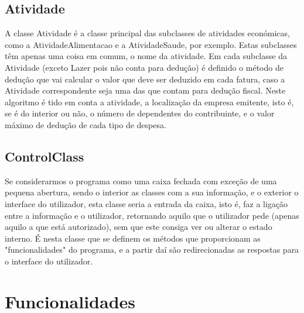 
\subsection{Atividade}
A classe Atividade é a classe principal das subclasses de atividades económicas, como a AtividadeAlimentacao e a AtividadeSaude, por exemplo. Estas subclasses têm apenas uma coisa em comum, o nome da atividade. Em cada subclasse da Atividade (exceto Lazer pois não conta para dedução) é definido o método de dedução que vai calcular o valor que deve ser deduzido em cada fatura, caso a Atividade correspondente seja uma das que contam para dedução fiscal. Neste algoritmo é tido em conta a atividade, a localização da empresa emitente, isto é, se é do interior ou não, o número de dependentes do contribuinte, e o valor máximo de dedução de cada tipo de despesa.

\subsection{ControlClass}
Se considerarmos o programa como uma caixa fechada com exceção de uma pequena abertura, sendo o interior as classes com a sua informação, e o exterior o interface do utilizador, esta classe seria a entrada da caixa, isto é, faz a ligação entre a informação e o utilizador, retornando aquilo que o utilizador pede (apenas aquilo a que está autorizado), sem que este consiga ver ou alterar o estado interno. É nesta classe que se definem os métodos que proporcionam as "funcionalidades" do programa, e a partir daí são redirecionadas as respostas para o interface do utilizador.

\section{Funcionalidades}

